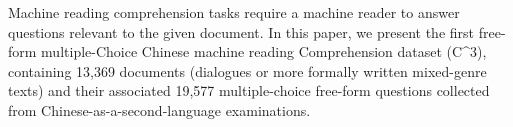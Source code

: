 Machine reading comprehension tasks require a machine reader to answer questions relevant to the given document. In this paper, we present the first free-form multiple-Choice Chinese machine reading Comprehension dataset (C^3), containing 13,369 documents (dialogues or more formally written mixed-genre texts) and their associated 19,577 multiple-choice free-form questions collected from Chinese-as-a-second-language examinations.